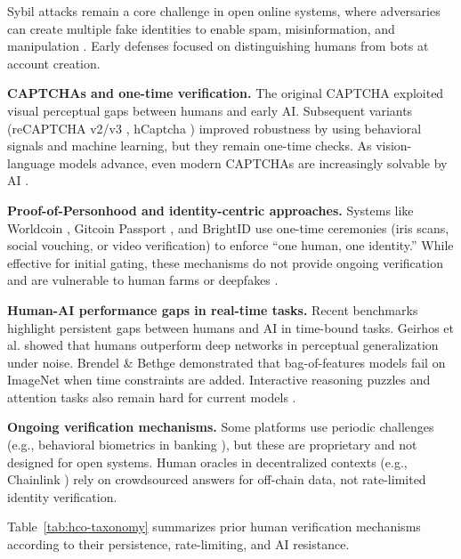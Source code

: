 \documentclass[sigconf,nonacm]{acmart}
\begin{document}
Sybil attacks remain a core challenge in open online systems, where adversaries can create multiple fake identities to enable spam, misinformation, and manipulation \cite{douceur2002sybil}. Early defenses focused on distinguishing humans from bots at account creation.

\textbf{CAPTCHAs and one-time verification.} The original CAPTCHA \cite{vonahn2003captcha} exploited visual perceptual gaps between humans and early AI. Subsequent variants (reCAPTCHA v2/v3 \cite{reCAPTCHA2019}, hCaptcha \cite{hCaptcha2020}) improved robustness by using behavioral signals and machine learning, but they remain one-time checks. As vision-language models advance, even modern CAPTCHAs are increasingly solvable by AI \cite{geirhos2018generalisation,brendel2019approximating}.

\textbf{Proof-of-Personhood and identity-centric approaches.} Systems like Worldcoin \cite{worldcoin2023}, Gitcoin Passport \cite{gitcoin2023}, and BrightID \cite{brightid2022} use one-time ceremonies (iris scans, social vouching, or video verification) to enforce ``one human, one identity.'' While effective for initial gating, these mechanisms do not provide ongoing verification and are vulnerable to human farms or deepfakes \cite{west2020proof}.

\textbf{Human-AI performance gaps in real-time tasks.} Recent benchmarks highlight persistent gaps between humans and AI in time-bound tasks. Geirhos et al. \cite{geirhos2018generalisation} showed that humans outperform deep networks in perceptual generalization under noise. Brendel \& Bethge \cite{brendel2019approximating} demonstrated that bag-of-features models fail on ImageNet when time constraints are added. Interactive reasoning puzzles and attention tasks also remain hard for current models \cite{schuett2023human}.

\textbf{Ongoing verification mechanisms.} Some platforms use periodic challenges (e.g., behavioral biometrics in banking \cite{biometrics2021}), but these are proprietary and not designed for open systems. Human oracles in decentralized contexts (e.g., Chainlink \cite{ellis2017chainlink}) rely on crowdsourced answers for off-chain data, not rate-limited identity verification.

Table~\ref{tab:hco-taxonomy} summarizes prior human verification mechanisms according to their persistence, rate-limiting, and AI resistance.
\end{document}
